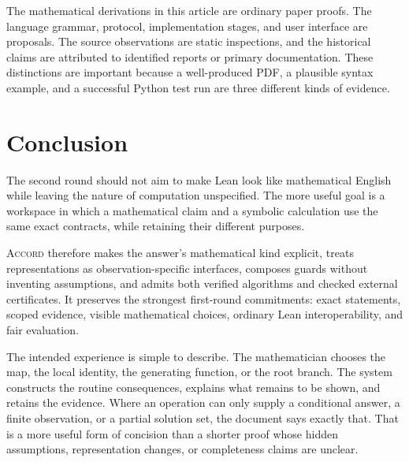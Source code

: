 \documentclass[11pt,a4paper]{article}
\newcommand{\Accord}{\textsc{Accord}}
\theoremstyle{definition}
\begin{document}
The mathematical derivations in this article are ordinary paper proofs. The
language grammar, protocol, implementation stages, and user interface are
proposals. The source observations are static inspections, and the historical
claims are attributed to identified reports or primary documentation. These
distinctions are important because a well-produced PDF, a plausible syntax
example, and a successful Python test run are three different kinds of evidence.

\section{Conclusion}
The second round should not aim to make Lean look like mathematical English
while leaving the nature of computation unspecified. The more useful goal is
a workspace in which a mathematical claim and a symbolic calculation use the
same exact contracts, while retaining their different purposes.

\Accord{} therefore makes the answer's mathematical kind explicit, treats
representations as observation-specific interfaces, composes guards without
inventing assumptions, and admits both verified algorithms and checked external
certificates. It preserves the strongest first-round commitments: exact
statements, scoped evidence, visible mathematical choices, ordinary Lean
interoperability, and fair evaluation.

The intended experience is simple to describe. The mathematician chooses the
map, the local identity, the generating function, or the root branch. The system
constructs the routine consequences, explains what remains to be shown, and
retains the evidence. Where an operation can only supply a conditional answer,
a finite observation, or a partial solution set, the document says exactly that.
That is a more useful form of concision than a shorter proof whose hidden
assumptions, representation changes, or completeness claims are unclear.

\appendix
\clearpage
\end{document}

